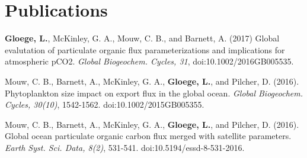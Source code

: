 \documentclass[11pt,letterpaper,sans]{moderncv}
\begin{document}
\section{Publications}
\cvline{\small [3]}%
{\small  \textbf{Gloege, L.}, McKinley, G. A., Mouw, C. B., and Barnett, A. (2017)
Global evalutation of particulate organic flux parameterizations and implications for atmospheric pCO2.
\textit{Global Biogeochem. Cycles, 31}, doi:10.1002/2016GB005535.}

\cvline{\small [2]}%
{\small Mouw, C. B., Barnett, A., McKinley, G. A., \textbf{Gloege, L.}, and Pilcher, D. (2016).
Phytoplankton size impact on export flux in the global ocean.
\textit{Global Biogeochem. Cycles, 30(10)}, 1542-1562. doi:10.1002/2015GB005355.}

\cvline{\small [1]}%
{\small Mouw, C. B., Barnett, A., McKinley, G. A., \textbf{Gloege, L.}, and Pilcher, D. (2016).
Global ocean particulate organic carbon flux merged with satellite parameters.
\textit{Earth Syst. Sci. Data, 8(2)}, 531-541. doi:10.5194/essd-8-531-2016.}


%




\end{document}
